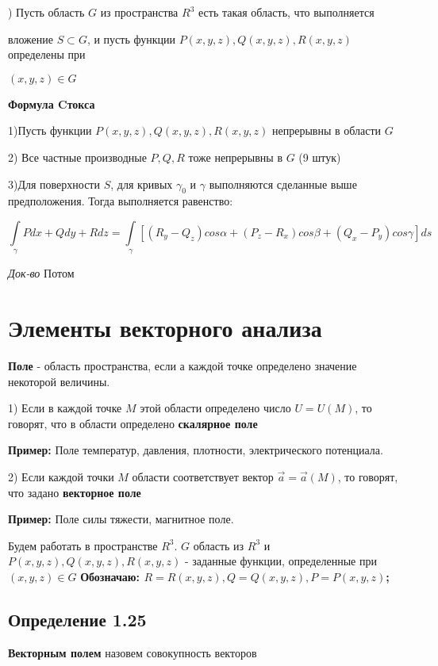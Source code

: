 \documentclass[12pt]{article}
\begin{document}
) Пусть область $G$ из пространства $R^3$ есть такая область, что
выполняется\par  вложение $S \subset G$, и пусть функции $P(x, y, z), Q(x, y, z),
R(x, y, z)$ определены при \par $(x, y, z) \in G$

\textbf{Формула Cтокса}

1)Пусть функции $P(x, y, z), Q(x, y, z), R(x, y, z)$ непрерывны в области $G$ 

2) Все частные производные $P , Q , R$ тоже непрерывны в $G$ (9 штук)

3)Для поверхности $S$, для кривых $\gamma_0$ и $\gamma$ выполняются сделанные выше
предположения. Тогда выполняется равенство: 

\begin{equation}\label{eq11}
\int\limits_{\gamma} Pdx + Qdy + Rdz
=
\int\limits_{\gamma} [(R_y - Q_z)cos\alpha + (P_z - R_x)cos\beta	+ (Q_x - P_y)cos\gamma]ds
\end{equation}

\textit{Док-во}
Потом



\newpage
\section{Элементы векторного анализа}
	
	\textbf{Поле} - область пространства, если а каждой точке определено значение некоторой величины.
	
	1) Если в каждой точке $M$  этой области определено число $U = U(M)$, то говорят, что в области определено \textbf{скалярное поле}
	
\textbf{Пример:} Поле температур, давления, плотности, электрического потенциала.	

	2) Если каждой точки $M$ области соответствует вектор $\vec{a} = \vec{a}(M)$, то говорят, что задано \textbf{векторное поле}
	
\textbf{Пример:} Поле силы тяжести, магнитное поле.


	Будем работать в пространстве $R^3$. $G$ область из $R^3$ и $P(x,y,z), Q(x,y,z), R(x,y,z)$ - заданные функции, определенные при 
	$(x,y,z) \in G$
	\textbf{Обозначаю: $R = R(x, y ,z) , Q = Q(x,y,z) , P = P(x,y,z)$;}
	
\subsection*{Определение 1.25}
	\textbf{Векторным полем} назовем совокупность векторов 
	
\end{document}
